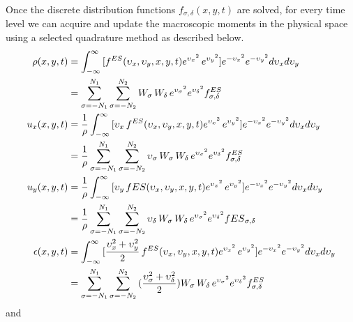 \documentclass{rsproca}%
\begin{document}
Once the discrete distribution functions $f_{\sigma,\delta}(x,y,t)$ are solved, for every time level we can acquire and update the macroscopic moments in the physical space using a selected quadrature method as described below.
\begin{align}
	\begin{split}
\rho(x,y,t) &= \int^{\infty}_{-\infty}{[f^{ES}(\upsilon_x,\upsilon_y,x,y,t)e^{{\upsilon_x}^2}\,e^{{\upsilon_y}^2}]e^{-{\upsilon_x}^2}e^{-{\upsilon_y}^2}d\upsilon_x d\upsilon_y}  \\
&=\sum^{N_1}_{\sigma=-N_1}\sum^{N_2}_{\sigma=-N_2}{W_\sigma\,W_\delta\,e^{{\upsilon_\sigma}^2}e^{{\upsilon_\delta}^2}f^{ES}_{\sigma,\delta}} \\
u_x(x,y,t) &= {1 \over \rho} \int^{\infty}_{-\infty}{[\upsilon_x\,f^{ES}(\upsilon_x,\upsilon_y,x,y,t)e^{{\upsilon_x}^2}\,e^{{\upsilon_y}^2}]e^{-{\upsilon_x}^2}e^{-{\upsilon_y}^2}d\upsilon_x d\upsilon_y}  \\
&= {1 \over \rho} \sum^{N_1}_{\sigma=-N_1}\sum^{N_2}_{\sigma=-N_2}{\upsilon_\sigma\,W_\sigma\,W_\delta\,e^{{\upsilon_\sigma}^2} e^{{\upsilon_\delta}^2}f^{ES}_{\sigma,\delta}}  \\
u_y(x,y,t) &= {1 \over \rho} \int^{\infty}_{-\infty}{[\upsilon_y\,f{ES}(\upsilon_x,\upsilon_y,x,y,t)e^{{\upsilon_x}^2}\,e^{{\upsilon_y}^2}]e^{-{\upsilon_x}^2}e^{-{\upsilon_y}^2}d\upsilon_x d\upsilon_y}  \\
&= {1 \over \rho} \sum^{N_1}_{\sigma=-N_1}\sum^{N_2}_{\sigma=-N_2}{\upsilon_\delta\,W_\sigma\,W_\delta\,e^{{\upsilon_\sigma}^2} e^{{\upsilon_\delta}^2}f{ES}_{\sigma,\delta}} \\
\epsilon(x,y,t) &= \int^{\infty}_{-\infty}{[\frac{\upsilon^2_x+\upsilon^2_y}{2}\,f^{ES}(\upsilon_x,\upsilon_y,x,y,t)e^{{\upsilon_x}^2}\,e^{{\upsilon_y}^2}] e^{-{\upsilon_x}^2}e^{-{\upsilon_y}^2}d\upsilon_x d\upsilon_y} \\
&= \sum^{N_1}_{\sigma=-N_1}\sum^{N_2}_{\sigma=-N_2}{(\frac{\upsilon^2_\sigma+\upsilon^2_\delta}{2})W_\sigma\,W_\delta\,e^{{\upsilon_\sigma}^2} e^{{\upsilon_\delta}^2}f^{ES}_{\sigma,\delta}} 
	\end{split}
\end{align}
and
\end{document}
